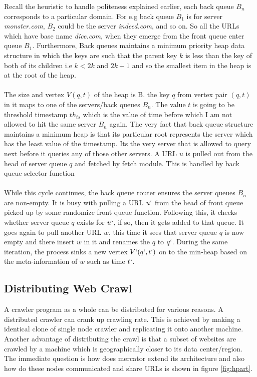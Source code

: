 \noindent
Recall the heuristic to handle politeness explained earlier, each back queue $B_n$ corresponds to a particular domain. For e.g back queue $B_1$ is for server \textit{monster.com}, $B_2$ could be the server \textit{indeed.com}, and so on. So all the URLs which have base name \textit{dice.com}, when they emerge from the front
queue enter queue $B_1$. Furthermore, Back queues maintains a minimum priority heap data structure in which
the keys are such that the parent key $k$ is less than the key of both of its children i.e $k < 2k$ and $2k+1$ and so the smallest item in the heap is at the root of the heap.
\\
\\
The size and vertex $V(q,t)$ of the heap is B. the key $q$ from vertex pair $(q, t)$ in it maps to one of the servers/back queues $B_n$. The value $t$ is going to be threshold timestamp $th_{ts}$ which is the value
of time before which I am not allowed to hit the same server $B_n$ again. The very fact that back queue structure maintains a minimum heap is that its particular root represents the server which has the least value
of the timestamp. Its the very server that is allowed to query next before it queries any of those other servers. A URL $u$ is pulled out from the head of server queue $q$ and fetched by fetch module. This is handled by back queue selector function
\\
\\
While this cycle continues, the back queue router ensures the server queues $B_n$ are non-empty.  It is busy with pulling a URL $u`$ from the head of front queue picked up by some randomize front queue function. Following this, it checks whether server queue $q$ exists for $u`$, if so, then it gets added to that queue. It goes again to pull another URL $w$, this time it sees that server queue $q$ is now empty and there insert $w$ in it and renames the $q$ to $q`$. During the same iteration, the process sinks a new vertex
$V`(q`,t`)$ on to the min-heap based on the meta-information of $w$ such as time $t`$.



\pagebreak

\subsection{Distributing Web Crawl}
A crawler program as a whole can be distributed for various reasons. A distributed crawler can crank up crawling rate. This is achieved by making a identical clone of single node crawler and replicating it onto another machine. Another advantage of distributing the crawl is that a subset of websites are crawled by a machine which is geographically closer to its data center/region. The immediate question is how does mercator extend its architecture and also how do these nodes communicated and share URLs is shown in figure \ref{fig:hpart}.

